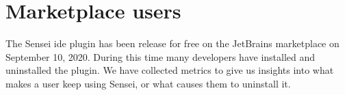 \section{Marketplace users}
\label{sec:marketplace}

The Sensei \gls{ide} plugin has been release for free on the JetBrains marketplace on September 10, 2020.
During this time many developers have installed and uninstalled the plugin.
We have collected metrics to give us insights into what makes a user keep using Sensei, or what causes them to uninstall it.


%
%
%
%
%
%
